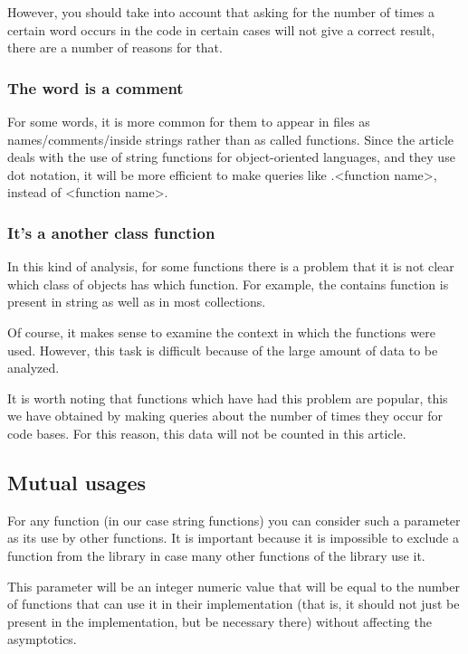 \documentclass[anonymous,sigplan,review,11pt,nonacm,natbib=false]{acmart}
\begin{document}
    However, you should take into account that asking for the number of times a certain word occurs in the code in certain cases will not give a correct result, there are a number of reasons for that.

    \subsubsection{The word is a comment} \hl{}

    For some words, it is more common for them to appear in files as names/comments/inside strings rather than as called functions. Since the article deals with the use of string functions for object-oriented languages, and they use dot notation, it will be more efficient to make queries like .<function name>, instead of <function name>.

    \subsubsection{It's a another class function} \hl{}

    In this kind of analysis, for some functions there is a problem that it is not clear which class of objects has which function. For example, the contains function is present in string as well as in most collections.

    Of course, it makes sense to examine the context in which the functions were used. However, this task is difficult because of the large amount of data to be analyzed.

    It is worth noting that functions which have had this problem are popular, this we have obtained by making queries about the number of times they occur for code bases. For this reason, this data will not be counted in this article.

    \subsection{Mutual usages}

    For any function (in our case string functions) you can consider such a parameter as its use by other functions. It is important because it is impossible to exclude a function from the library in case many other functions of the library use it.

    This parameter will be an integer numeric value that will be equal to the number of functions that can use it in their implementation (that is, it should not just be present in the implementation, but be necessary there) without affecting the asymptotics.
\end{document}
